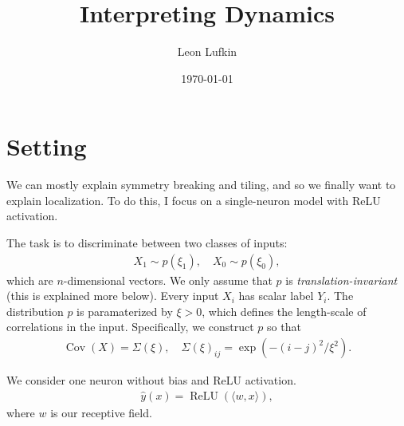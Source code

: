 \documentclass{article}
\title{Interpreting Dynamics}
\author{Leon Lufkin}
\date{\today}
\begin{document}
\section{Setting}
We can mostly explain symmetry breaking and tiling, and so we finally want to explain localization.
To do this, I focus on a single-neuron model with ReLU activation.

The task is to discriminate between two classes of inputs:
\begin{align}
  X_1 \sim p(\xi_1), \quad X_0 \sim p(\xi_0),
\end{align}
which are $n$-dimensional vectors.
We only assume that $p$ is \emph{translation-invariant} (this is explained more below).
Every input $X_i$ has scalar label $Y_i$.
The distribution $p$ is paramaterized by $\xi > 0$, which defines the length-scale of correlations in the input.
Specifically, we construct $p$ so that
\begin{align}
  \operatorname{Cov}(X) = \Sigma(\xi), \quad \Sigma(\xi)_{ij} = \exp(-(i-j)^2 / \xi^2).
\end{align}



We consider one neuron without bias and ReLU activation.
\begin{align}
  \hat{y}(x) = \operatorname{ReLU}(\langle w, x \rangle),
\end{align}
where $w$ is our receptive field.

\end{document}
